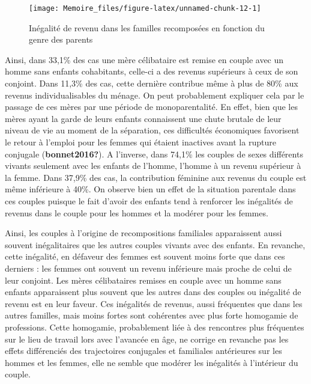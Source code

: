 \documentclass[
  12pt,
]{book}
\begin{document}
\begin{figure}[h]

{\centering \texttt{[image: Memoire\_files/figure-latex/unnamed-chunk-12-1]} 

}

\caption{Inégalité de revenu dans les familles recomposées en fonction du genre des parents}\label{fig:unnamed-chunk-12}
\end{figure}

Ainsi, dans 33,1\% des cas une mère célibataire est remise en couple
avec un homme sans enfants cohabitants, celle-ci a des revenus
supérieurs à ceux de son conjoint. Dans 11,3\% des cas, cette dernière
contribue même à plus de 80\% aux revenus individualisables du ménage.
On peut probablement expliquer cela par le passage de ces mères par une
période de monoparentalité. En effet, bien que les mères ayant la garde
de leurs enfants connaissent une chute brutale de leur niveau de vie au
moment de la séparation, ces difficultés économiques favorisent le
retour à l'emploi pour les femmes qui étaient inactives avant la rupture
conjugale (\textbf{bonnet2016?}). A l'inverse, dans 74,1\% les couples
de sexes différents vivants seulement avec les enfants de l'homme,
l'homme à un revenu supérieur à la femme. Dans 37,9\% des cas, la
contribution féminine aux revenus du couple est même inférieure à 40\%.
On observe bien un effet de la situation parentale dans ces couples
puisque le fait d'avoir des enfants tend à renforcer les inégalités de
revenus dans le couple pour les hommes et la modérer pour les femmes.

Ainsi, les couples à l'origine de recompositions familiales apparaissent
aussi souvent inégalitaires que les autres couples vivants avec des
enfants. En revanche, cette inégalité, en défaveur des femmes est
souvent moins forte que dans ces derniers : les femmes ont souvent un
revenu inférieure mais proche de celui de leur conjoint. Les mères
célibataires remises en couple avec un homme sans enfants apparaissent
plus souvent que les autres dans des couples ou inégalité de revenu est
en leur faveur. Ces inégalités de revenus, aussi fréquentes que dans les
autres familles, mais moins fortes sont cohérentes avec plus forte
homogamie de professions. Cette homogamie, probablement liée à des
rencontres plus fréquentes sur le lieu de travail lors avec l'avancée en
âge, ne corrige en revanche pas les effets différenciés des trajectoires
conjugales et familiales antérieures sur les hommes et les femmes, elle
ne semble que modérer les inégalités à l'intérieur du couple.
\end{document}
